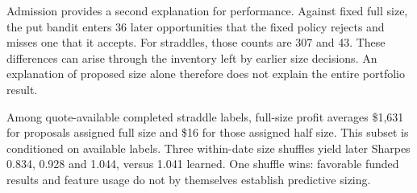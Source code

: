 Admission provides a second explanation for performance. Against fixed full size, the put bandit enters 36 later opportunities that the fixed policy rejects and misses one that it accepts. For straddles, those counts are 307 and 43. These differences can arise through the inventory left by earlier size decisions. An explanation of proposed size alone therefore does not explain the entire portfolio result.


Among quote-available completed straddle labels, full-size profit averages \$1,631 for proposals assigned full size and \$16 for those assigned half size. This subset is conditioned on available labels. Three within-date size shuffles yield later Sharpes 0.834, 0.928 and 1.044, versus 1.041 learned. One shuffle wins: favorable funded results and feature usage do not by themselves establish predictive sizing.


\FloatBarrier
